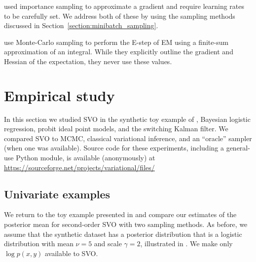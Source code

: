 \citet{carbonetto:2009} used importance sampling to approximate a
gradient and require learning rates to be carefully set.  We address
both of these by using the sampling methods discussed in
Section~\ref{section:minibatch_sampling}.

\citet{wei:1990} use Monte-Carlo sampling to perform the E-step of EM
using a finite-sum approximation of an integral. While they
explicitly outline the gradient and Hessian of the expectation, they
never use these values.


\section{Empirical study}

In this section we studied SVO in the synthetic toy example of
, Bayesian logistic regression,
probit ideal point models, and the switching Kalman filter.  We
compared SVO to MCMC, classical variational inference, and an
``oracle'' sampler (when one was available).
Source code for these experiments, including a general-use
Python module, is available (anonymously) at
\url{https://sourceforge.net/projects/variational/files/}

\subsection{Univariate examples}
\label{section:univariate_example}
We return to the toy example presented in
 and compare our estimates of
the posterior mean for second-order SVO with two sampling methods. As
before, we assume that the synthetic dataset has a posterior
distribution that is a logistic distribution with mean $\nu=5$ and
scale $\gamma=2$, illustrated in
. We make only
$\log p(x, y)$ available to SVO.

